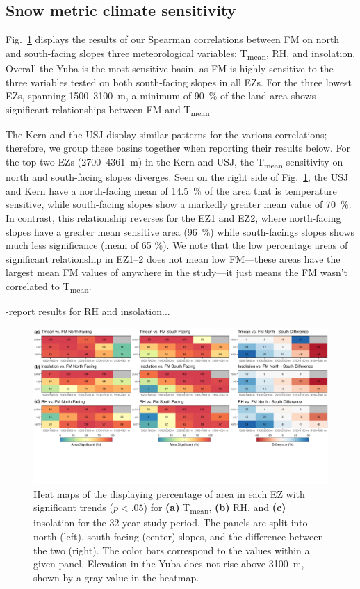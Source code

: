 \hypertarget{ch2-results-3}{\subsection{Snow metric climate sensitivity}\label{ch2-results-3}}

Fig.~\ref{fig:heat_map} displays the results of our Spearman correlations between FM on north and south-facing slopes three meteorological variables: T\textsubscript{mean}, RH, and insolation. Overall the Yuba is the most sensitive basin, as FM is highly sensitive to the three variables tested on both south-facing slopes in all EZs. For the three lowest EZs, spanning 1500--3100~m, a minimum of 90~\% of the land area shows significant relationships between FM and T\textsubscript{mean}. 

The Kern and the USJ display similar patterns for the various correlations; therefore, we group these basins together when reporting their results below. For the top two EZs (2700--4361~m) in the Kern and USJ, the T\textsubscript{mean} sensitivity on north and south-facing slopes diverges. Seen on the right side of Fig.~\ref{fig:heat_map}, the USJ and Kern have a north-facing mean of 14.5~\% of the area that is temperature sensitive, while south-facing slopes show a markedly greater mean value of 70~\%. In contrast, this relationship reverses for the EZ1 and EZ2, where north-facing slopes have a greater mean sensitive area (96~\%) while south-facings slopes shows much less significance (mean of 65 \%). We note that the low percentage areas of significant relationship in EZ1--2 does not mean low FM---these areas have the largest mean FM values of anywhere in the study---it just means the FM wasn't correlated to T\textsubscript{mean}.

-report results for RH and insolation...


\begin{figure}[h]
\centering
\includegraphics[width=\textwidth]{figures/ch2_figs/metvars_fm_heatmaps_v4.png}
\caption{Heat maps of the displaying percentage of area in each EZ with significant trends ($p < .05$) for \textbf{(a)} T\textsubscript{mean}, \textbf{(b)} RH, and \textbf{(c)} insolation for the 32-year study period. The panels are split into north (left), south-facing (center) slopes, and the difference between the two (right). The color bars correspond to the values within a given panel. Elevation in the Yuba does not rise above 3100~m, shown by a gray value in the heatmap.}
\label{fig:heat_map}
\end{figure}



